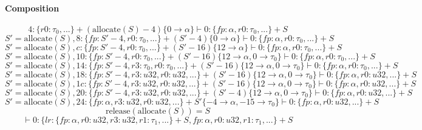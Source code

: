 \documentclass{article}
\begin{document}
\paragraph{Composition}
\[4 : \{r0 : \tau_0, ...\}+(\mathrm{allocate}(S)-4)\{0 \rightarrow \alpha\} \vdash 0: \{fp : \alpha, r0 : \tau_0, ...\}+S\]
\[S' = \mathrm{allocate}(S), 8 : \{fp : S'-4, r0 : \tau_0, ...\}+(S'-4)\{0 \rightarrow \alpha\} \vdash 0: \{fp : \alpha, r0 : \tau_0, ...\}+S\]
\[S' = \mathrm{allocate}(S), c : \{fp : S'-4, r0 : \tau_0, ...\}+(S'-16)\{12 \rightarrow \alpha\} \vdash 0: \{fp : \alpha, r0 : \tau_0, ...\}+S\]
\[S' = \mathrm{allocate}(S), 10 : \{fp : S'-4, r0 : \tau_0, ...\}+(S'-16)\{12 \rightarrow \alpha, 0 \rightarrow \tau_0\} \vdash 0: \{fp : \alpha, r0 : \tau_0, ...\}+S\]
\[S' = \mathrm{allocate}(S), 14 : \{fp : S'-4, r3 : \tau_0, r0 : \tau_0, ...\}+(S'-16)\{12 \rightarrow \alpha, 0 \rightarrow \tau_0\} \vdash 0: \{fp : \alpha, r0 : \tau_0, ...\}+S\]
\[S' = \mathrm{allocate}(S), 18 : \{fp : S'-4, r3 : u32, r0 : u32, ...\}+(S'-16)\{12 \rightarrow \alpha, 0 \rightarrow \tau_0\} \vdash 0: \{fp : \alpha, r0 : u32, ...\}+S\]
\[S' = \mathrm{allocate}(S), 1c : \{fp : S'-4, r3 : u32, r0 : u32, ...\}+(S'-16)\{12 \rightarrow \alpha, 0 \rightarrow \tau_0\} \vdash 0: \{fp : \alpha, r0 : u32, ...\}+S\]
\[S' = \mathrm{allocate}(S), 20 : \{fp : S'-4, r3 : u32, r0 : u32, ...\}+(S'-4)\{12 \rightarrow \alpha, 0 \rightarrow \tau_0\} \vdash 0: \{fp : \alpha, r0 : u32, ...\}+S\]
\[S' = \mathrm{allocate}(S), 24 : \{fp : \alpha, r3 : u32, r0 : u32, ...\}+S'\{-4 \rightarrow \alpha, -15 \rightarrow \tau_0\} \vdash 0: \{fp : \alpha, r0 : u32, ...\}+S\]
\[\mathrm{release}(\mathrm{allocate}(S)) = S\]
\[\vdash 0: \{lr : \{fp : \alpha, r0 : u32, r3 : u32, r1 : \tau_1, ...\}+S, fp : \alpha, r0 : u32, r1 : \tau_1, ...\}+S\]
\end{document}
